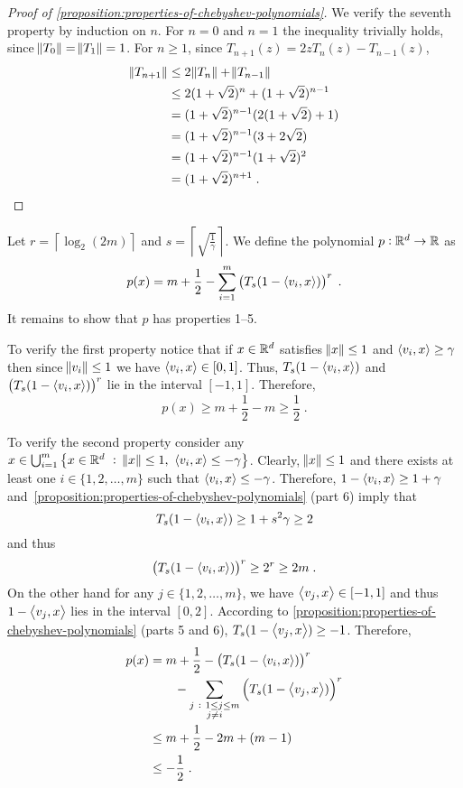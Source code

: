 \begin{proof}[Proof of \autoref{proposition:properties-of-chebyshev-polynomials}]
We verify the seventh property by induction on $n$.
For $n=0$ and $n=1$ the inequality trivially holds, since $\norm{T_0} = \norm{T_1} = 1$.
For $n \ge 1$, since $T_{n+1}(z) = 2zT_n(z) - T_{n-1}(z)$,
\begin{align*}
\norm{T_{n+1}}
& \le 2 \norm{T_n} + \norm{T_{n-1}} \\
& \le 2 (1 + \sqrt{2})^n + (1 + \sqrt{2})^{n-1} \\
& = (1 + \sqrt{2})^{n-1} (2 (1 + \sqrt{2}) + 1) \\
& = (1 + \sqrt{2})^{n-1} (3 + 2\sqrt{2}) \\
& = (1 + \sqrt{2})^{n-1} (1 + \sqrt{2})^2 \\
& = (1 + \sqrt{2})^{n+1} \; .
\end{align*}

\end{proof}

Let $r = \left\lceil \log_2(2m) \right\rceil$ and $s = \left\lceil \sqrt{\frac{1}{\gamma}} \right\rceil$.
We define the polynomial $p:\mathbb{R}^d \to \mathbb{R}$ as
$$
p(x) = m + \frac{1}{2} - \sum_{i=1}^m \left( T_s(1 - \left\langle v_i, x \right\rangle) \right)^r \; .
$$
It remains to show that $p$ has properties 1--5.

To verify the first property notice that if $x \in \mathbb{R}^d$ satisfies $\norm{x} \le
1$ and $\left\langle v_i, x \right\rangle \ge \gamma$ then since $\norm{v_i} \le 1$ we have
$\left\langle v_i, x \right\rangle \in [0,1]$. Thus, $T_s(1 - \left\langle v_i, x \right\rangle)$ and $\left( T_s(1 -
\left\langle v_i, x \right\rangle) \right)^r$ lie in the interval $[-1,1]$. Therefore,
$$
p(x) \ge m + \frac{1}{2} - m \ge \frac{1}{2} \; .
$$

To verify the second property consider any $x \in \bigcup_{i=1}^m \left\{ x \in \mathbb{R}^d
~:~ \norm{x} \le 1, \ \left\langle v_i, x \right\rangle \le - \gamma \right\}$. Clearly, $\norm{x} \le 1$
and there exists at least one $i \in \{1,2,\dots,m\}$ such that $\left\langle v_i, x \right\rangle \le
- \gamma$. Therefore, $1 - \left\langle v_i, x \right\rangle \ge 1 + \gamma$ and~\autoref{proposition:properties-of-chebyshev-polynomials} (part 6)
imply that
$$
T_s(1 - \left\langle v_i, x \right\rangle) \ge 1 + s^2 \gamma \ge 2
$$
and thus
$$
\left( T_s(1 - \left\langle v_i, x \right\rangle) \right)^r \ge 2^r \ge 2m \; .
$$
On the other hand for any $j \in \{1,2,\dots,m\}$, we have $\left\langle v_j, x \right\rangle \in
[-1,1]$ and thus $1 - \left\langle v_j, x \right\rangle$ lies in the interval $[0,2]$. According to
\autoref{proposition:properties-of-chebyshev-polynomials} (parts 5 and 6), $T_s(1 - \left\langle v_j, x \right\rangle)
\ge -1$. Therefore,
\begin{align*}
p(x) & = m + \frac{1}{2} - \left( T_s(1 - \left\langle v_i, x \right\rangle) \right)^r \\
& \qquad - \sum_{\substack{j ~:~  1 \le j \le m \\ j \neq i}} \left( T_s(1 - \left\langle v_j, x \right\rangle) \right)^r \\
& \le m + \frac{1}{2} - 2m + (m - 1) \\
& \le - \frac{1}{2} \; .
\end{align*}

